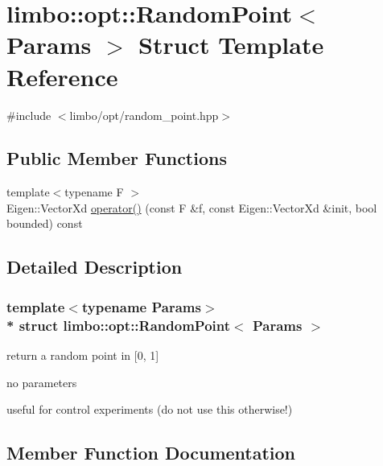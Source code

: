 \hypertarget{structlimbo_1_1opt_1_1_random_point}{}\section{limbo\+:\+:opt\+:\+:Random\+Point$<$ Params $>$ Struct Template Reference}
\label{structlimbo_1_1opt_1_1_random_point}


{\ttfamily \#include $<$limbo/opt/random\+\_\+point.\+hpp$>$}

\subsection*{Public Member Functions}
\begin{DoxyCompactItemize}
\item 
{\footnotesize template$<$typename F $>$ }\\Eigen\+::\+Vector\+Xd \hyperlink{structlimbo_1_1opt_1_1_random_point_a7403cebcb83dbaa75634965facfecc7e}{operator()} (const F \&f, const Eigen\+::\+Vector\+Xd \&init, bool bounded) const 
\end{DoxyCompactItemize}


\subsection{Detailed Description}
\subsubsection*{template$<$typename Params$>$\\*
struct limbo\+::opt\+::\+Random\+Point$<$ Params $>$}


\begin{DoxyItemize}
\item return a random point in \mbox{[}0, 1\mbox{]}
\item no parameters
\item useful for control experiments (do not use this otherwise!) 
\end{DoxyItemize}

\subsection{Member Function Documentation}
